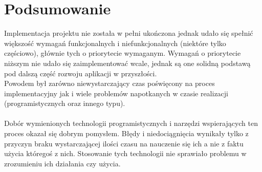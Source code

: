 \documentclass[eng,printmode]{mgr}
\begin{document}
\chapter{Podsumowanie}
Implementacja projektu nie została w pełni ukończona jednak udało się spełnić większość wymagań funkcjonalnych i niefunkcjonalnych (niektóre tylko częściowo), głównie tych o priorytecie wymaganym. Wymagań o priorytecie niższym nie udało się zaimplementować wcale, jednak są one solidną podstawą pod dalszą część rozwoju aplikacji w przyszłości.
\\
Powodem był zarówno niewystarczający czas poświęcony na proces implementacyjny jak i wiele problemów napotkanych w czasie realizacji (programistycznych oraz innego typu).
\\
\\
Dobór wymienionych technologii programistycznych i narzędzi wspierających ten proces okazał się dobrym pomysłem. Błędy i niedociągnięcia wynikały tylko z przyczyn braku wystarczającej ilości czasu na nauczenie się ich a nie z faktu użycia któregoś z nich. Stosowanie tych technologii nie sprawiało problemu w zrozumieniu ich działania czy użycia.
\end{document}
